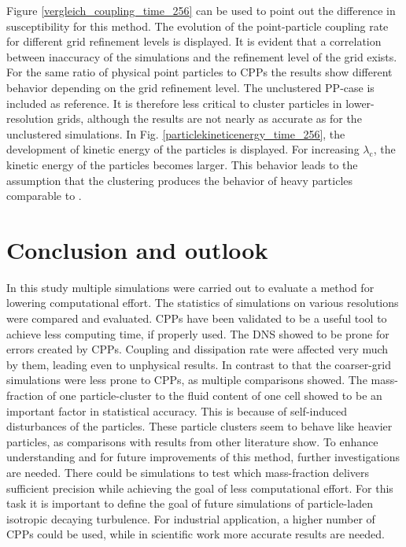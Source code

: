 \documentclass[11pt,a4paper,openany,oneside,parskip=half*]{article}
\begin{document}
Figure \ref{vergleich_coupling_time_256} can be used to point out the difference in susceptibility for this method. The evolution of the point-particle coupling rate for different grid refinement levels is displayed. It is evident that a correlation between inaccuracy of the simulations and the refinement level of the grid exists. For the same ratio of physical point particles to CPPs the results show different behavior depending on the grid refinement level. The unclustered PP-case is included as reference. It is therefore less critical to cluster particles in lower-resolution grids, although the results are not nearly as accurate as for the unclustered simulations. 
\newline %
In Fig. \ref{particlekineticenergy_time_256}, the development of kinetic energy of the particles is displayed. For increasing $\lambda_\mathrm{c}$, the kinetic energy of the particles becomes larger. This behavior leads to the assumption that the clustering produces the behavior of heavy particles comparable to \cite{Schneiders2017}. 
\pagebreak
\section{Conclusion and outlook}
In this study multiple simulations were carried out to evaluate a method for lowering computational effort. The statistics of simulations on various resolutions were compared and evaluated. CPPs have been validated to be a useful tool to achieve less computing time, if properly used.
\newline
The DNS showed to be prone for errors created by CPPs. Coupling and dissipation rate were affected very much by them, leading even to unphysical results. In contrast to that the coarser-grid simulations were less prone to CPPs, as multiple comparisons showed. The mass-fraction of one particle-cluster to the fluid content of one cell showed to be an important factor in statistical accuracy. This is because of self-induced disturbances of the particles. These particle clusters seem to behave like heavier particles, as comparisons with results from other literature show.
\newline
To enhance understanding and for future improvements of this method, further investigations are needed. There could be simulations to test which mass-fraction delivers sufficient precision while achieving the goal of less computational effort. For this task it is important to define the goal of future simulations of particle-laden isotropic decaying turbulence. For industrial application, a higher number of CPPs could be used, while in scientific work more accurate results are needed. 
\newline
\pagebreak
\end{document}
